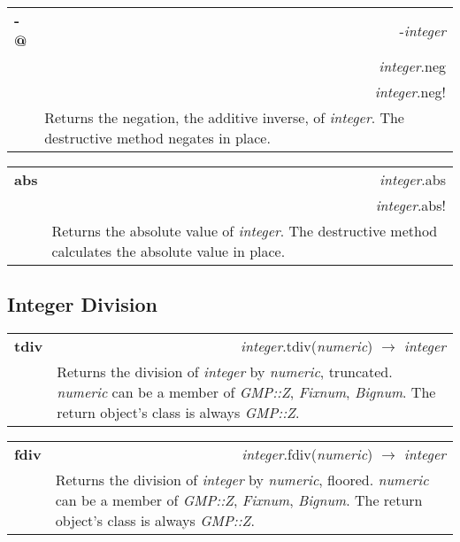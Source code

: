 \documentclass[pdftex,10pt]{article}
\newlength{\methwidth}
\newlength{\defnwidth}
\begin{document}
\begin{tabular}{p{\methwidth} l r}
\toprule
\textbf{-@} & & -\textit{integer}\\
& & \textit{integer}.neg\\
& & \textit{integer}.neg!\\
\cmidrule(r){2-3}
& \multicolumn{2}{p{\defnwidth}}{
  Returns the negation, the additive inverse, of \textit{integer}. The destructive method
  negates in place.
}
\end{tabular}
\newline\newline

\begin{tabular}{p{\methwidth} l r}
\toprule
\textbf{abs} & & \textit{integer}.abs\\
& & \textit{integer}.abs!\\
\cmidrule(r){2-3}
& \multicolumn{2}{p{\defnwidth}}{
  Returns the absolute value of \textit{integer}. The destructive method calculates the
  absolute value in place.
}
\end{tabular}

\subsection{Integer Division}

\begin{tabular}{p{\methwidth} l r}
\toprule
\textbf{tdiv} & & \textit{integer}.tdiv(\textit{numeric}) $\rightarrow$ \textit{integer}\\
\cmidrule(r){2-3}
& \multicolumn{2}{p{\defnwidth}}{
  Returns the division of \textit{integer} by \textit{numeric}, truncated.
  \textit{numeric} can be a member of \textit{GMP::Z}, \textit{Fixnum}, \textit{Bignum}.
  The return object's class is always \textit{GMP::Z}.
}
\end{tabular}
\newline\newline

\begin{tabular}{p{\methwidth} l r}
\toprule
\textbf{fdiv} & & \textit{integer}.fdiv(\textit{numeric}) $\rightarrow$ \textit{integer}\\
\cmidrule(r){2-3}
& \multicolumn{2}{p{\defnwidth}}{
  Returns the division of \textit{integer} by \textit{numeric}, floored.
  \textit{numeric} can be a member of \textit{GMP::Z}, \textit{Fixnum}, \textit{Bignum}.
  The return object's class is always \textit{GMP::Z}.
}
\end{tabular}
\newline\newline
\end{document}
